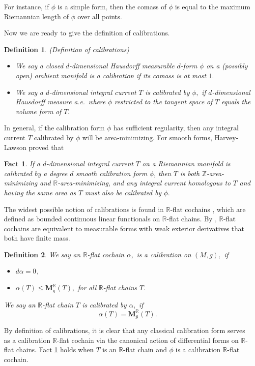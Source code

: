 \documentclass[11pt,a4paper]{amsart}
\numberwithin{equation}{section}
\newcommand{\ai}{\alpha}
\newcommand{\ms}{\mathbf{M}}
\newcommand{\R}{\mathbb{R}}
\newcommand{\Z}{\mathbb{Z}}
\theoremstyle{plain}
\newtheorem{fact}{Fact}[subsection]
\newtheorem{defn}{Definition}[subsection]
\theoremstyle{definition}
\numberwithin{equation}{subsection}
\begin{document}
	For instance, if $\phi$ is a simple form, then the comass of $\phi$ is equal to the maximum Riemannian length of $\phi$ over all points. 
	
	Now we are ready to give the definition of calibrations.
	\begin{defn}\label{defncal}(Definition of calibrations)
		\begin{itemize}
			\item 	We say a closed $d$-dimensional Hausdorff measurable $d$-form $\phi$ on a (possibly open) ambient manifold is a calibration if its comass is at most $1.$ 
			\item 
			We say a $d$-dimensional integral current $T$ is calibrated by $\phi,$ if $d$-dimensional Hausdorff measure a.e.~where $\phi$ restricted to the tangent space of $T$ equals the volume form of $T.$
		\end{itemize}
	\end{defn}
	In general, if the calibration form $\phi$ has sufficient regularity, then any integral current $T$ calibrated by $\phi$ will be area-minimizing. For smooth forms, Harvey-Lawson \cite[Chapter II, Theorem 4.2]{HL} proved that
	\begin{fact}\label{fcthl}
		If a $d$-dimensional integral current $T$ on a Riemannian manifold is calibrated by a degree $d$ smooth calibration form $\phi$, then $T$ is both $\Z$-area-minimizing and $\R$-area-minimizing, and any integral current homologous to $T$ and having the same area as $T$ must also be calibrated by $\phi.$
	\end{fact}
	The widest possible notion of calibrations is found in $\R$-flat cochains \cite{HFrf}, which are defined as bounded continuous linear functionals on $\R$-flat chains. By \cite[Section 4.1.19]{FF}, $\R$-flat cochains are equivalent to measurable forms with weak exterior derivatives that both have finite mass.
	\begin{defn}\label{defncalr}
		We say an $\R$-flat cochain $\ai,$ is a calibration on $(M,g),$ if 
		\begin{itemize}
			\item $d\ai=0,$
			\item $\ai(T)\le \ms^{\R}_g(T),$ for all $\R$-flat chains $T.$
		\end{itemize}
		We say an $\R$-flat chain $T$ is calibrated by $\ai,$ if
		$$\ai(T)=\ms^{\R}_g(T).$$	
	\end{defn}
	By definition of calibrations, it is clear that any classical calibration form serves as a calibration $\R$-flat cochain via the canonical action of differential forms on $\R$-flat chains. Fact \ref{fcthl} holds when $T$ is an $\R$-flat chain and $\phi$ is a calibration $\R$-flat cochain.
	
\end{document}
